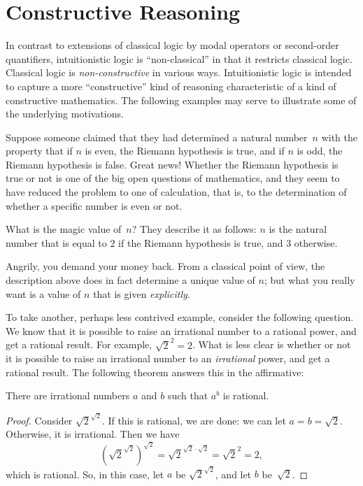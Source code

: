 \documentclass[../../../include/open-logic-chapter]{subfiles}
\begin{document}

\section{Constructive Reasoning}

In contrast to extensions of classical logic by modal operators or
second-order quantifiers, intuitionistic logic is ``non-classical'' in
that it restricts classical logic.  Classical logic is
\emph{non-constructive} in various ways. Intuitionistic logic is
intended to capture a more ``constructive'' kind of reasoning
characteristic of a kind of constructive mathematics. The following
examples may serve to illustrate some of the underlying motivations.

Suppose someone claimed that they had determined a natural number~$n$
with the property that if $n$ is even, the Riemann hypothesis is
true, and if $n$ is odd, the Riemann hypothesis is false. Great
news!{} Whether the Riemann hypothesis is true or not is one of the
big open questions of mathematics, and they seem to have reduced the
problem to one of calculation, that is, to the determination of
whether a specific number is even or not.

What is the magic value of~$n$? They describe it as follows: $n$ is
the natural number that is equal to $2$ if the Riemann hypothesis is
true, and $3$ otherwise.

Angrily, you demand your money back. From a classical point of view,
the description above does in fact determine a unique value of $n$;
but what you really want is a value of $n$ that is given
\emph{explicitly}.

To take another, perhaps less contrived example, consider the
following question. We know that it is possible to raise an irrational
number to a rational power, and get a rational result. For example,
$\sqrt{2}^2 = 2$. What is less clear is whether or not it is possible
to raise an irrational number to an \emph{irrational} power, and get a
rational result. The following theorem answers this in the
affirmative:

\begin{thm}
There are irrational numbers $a$ and $b$ such that $a^b$ is rational.
\end{thm}

\begin{proof}
Consider $\sqrt{2}^{\sqrt{2}}$. If this is rational, we are done:
we can let $a = b = \sqrt{2}$. Otherwise, it is irrational. Then we
have
\[
(\sqrt{2}^{\sqrt{2}})^{\sqrt{2}} = \sqrt{2}^{\sqrt{2} \cdot
  \sqrt{2}} = \sqrt{2}^2 = 2,
\]
which is rational. So, in this case, let $a$ be
$\sqrt{2}^{\sqrt{2}}$, and let $b$ be~$\sqrt 2$.
\end{proof}
\end{document}
